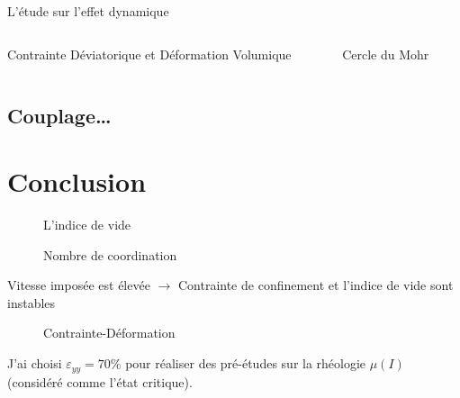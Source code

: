 \documentclass[a4paper,12pt]{report}
\begin{document}
                                \begin{frame}{L'étude sur l'effet dynamique}
    \begin{columns}
        \begin{column}{0.5\textwidth}
            \centering
            \scalebox{0.5}{}
            \vspace{0.5em}
            {\small Contrainte Déviatorique et Déformation Volumique}
        \end{column}
            
        \begin{column}{0.5\textwidth}
            \centering
            \scalebox{0.5}{}
            \vspace{0.5em}
            {\small Cercle du Mohr}
        \end{column}
        \end{columns}

    \end{frame}

\section{Couplage\ldots}

\chapter{Conclusion}

                                \begin{figure}
                                    \centering
                                  \small
                                  
                                    \caption{L'indice de vide}
                                \end{figure}
                                    
                                \begin{figure}
                                   
                                    \caption{Nombre de coordination}
                                \end{figure}

                                Vitesse imposée est élevée $\rightarrow$ Contrainte de confinement et l'indice de vide sont instables

     
                                \begin{figure}
                                    
                                    \caption{Contrainte-Déformation}
                                \end{figure}
                                J'ai choisi $\varepsilon_{yy} = 70\%$ pour réaliser des pré-études sur la rhéologie $\mu(I)$ (considéré comme l'état critique). 
\end{document}
